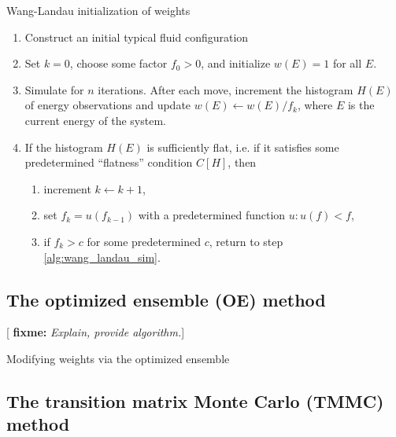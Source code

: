 \documentclass[11pt]{article}
\newcommand{\p}[1]{\left(#1\right)} %
\renewcommand{\sp}[1]{\left[#1\right]} %
\newenvironment{alg}
{\hrulefill\begin{enumerate}}
{\end{enumerate}\hrulefill}
\newcommand{\red}[1]{{\bf \color{red} #1}}
\newcommand{\fixme}[1]{[\red{fixme:} \emph{#1}]}
\begin{document}
\begin{algorithm}[tb]
  \caption{Wang-Landau initialization of weights}
  \label{alg:wang_landau}
  \begin{alg}

  \item Construct an initial typical fluid configuration

  \item Set $k=0$, choose some factor $f_0>0$, and initialize
    $w\p{E}=1$ for all $E$.

  \item Simulate for $n$ iterations. After each move, increment the
    histogram $H\p{E}$ of energy observations and update
    $w\p{E}\leftarrow w\p{E}/f_k$, where $E$ is the current energy of
    the system.
    \label{alg:wang_landau_sim}

  \item If the histogram $H\p{E}$ is sufficiently flat, i.e. if it
    satisfies some predetermined ``flatness'' condition $C\sp{H}$,
    then
    \begin{enumerate}[label=(\alph*)]
    \item increment $k\leftarrow k+1$,
    \item set $f_k=u\p{f_{k-1}}$ with a predetermined function
      $u:u\p{f}<f$,
    \item if $f_k>c$ for some predetermined $c$, return to step
      \ref{alg:wang_landau_sim}.
    \end{enumerate}

  \end{alg}
\end{algorithm}

\subsection{The optimized ensemble (OE) method}
\label{sec:optimized_ensemble}

\fixme{Explain, provide algorithm.}

\begin{algorithm}[H]
  \caption{Modifying weights via the optimized ensemble}
  \label{alg:optimized_ensemble}
\end{algorithm}

\subsection{The transition matrix Monte Carlo (TMMC) method}
\label{sec:tmmc}
\end{document}
